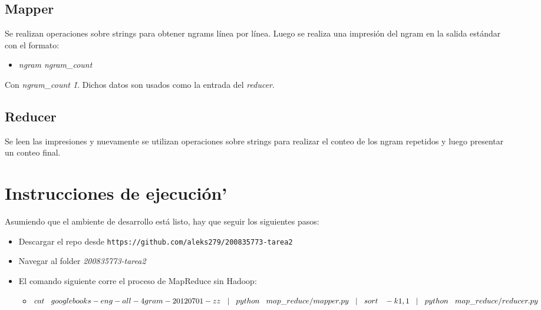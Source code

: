 \documentclass{article}
\begin{document}
\subsection{Mapper}
Se realizan operaciones sobre strings para obtener ngrams l\'inea por l\'inea. Luego se realiza una impresi\'on del ngram en la salida est\'andar con el formato:
\begin{itemize}
  \item \emph{ngram ngram\_count}
\end{itemize}
Con \emph{ngram\_count \= 1}. Dichos datos son usados como la entrada del \emph{reducer}.
\subsection{Reducer}
Se leen las impresiones y nuevamente se utilizan operaciones sobre strings para realizar el conteo de los ngram repetidos y luego presentar un conteo final.

\section{Instrucciones de ejecuci\'on'}
Asumiendo que el ambiente de desarrollo est\'a listo, hay que seguir los siguientes pasos:
\begin{itemize}
  \item Descargar el repo desde \texttt{https://github.com/aleks279/200835773-tarea2}
  \item Navegar al folder \emph{200835773-tarea2}
  \item El comando siguiente corre el proceso de MapReduce sin Hadoop:
  \begin{itemize}
    \item $cat\hspace{3mm}googlebooks-eng-all-4gram-20120701-zz\hspace{3mm}|\hspace{3mm}python\hspace{3mm}map\_reduce/mapper.py\hspace{3mm}|\hspace{3mm}sort\hspace{3mm}-k1,1\hspace{3mm}|\hspace{3mm}python\hspace{3mm}map\_reduce/reducer.py$
  \end{itemize}
\end{itemize}
\end{document}

